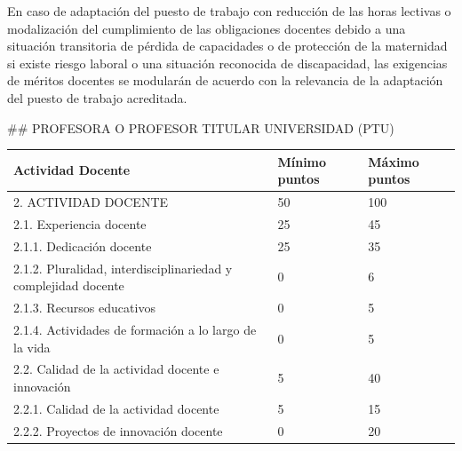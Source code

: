 \documentclass{article}
\begin{document}
\begin{itemize}
\begin{itemize}
\begin{scriptsize}
                  En caso de adaptación del puesto de trabajo con reducción de las horas lectivas o modalización del cumplimiento de las obligaciones docentes debido a una situación transitoria de pérdida de capacidades o de protección de la maternidad si existe riesgo laboral o una situación reconocida de discapacidad, las exigencias de méritos docentes se modularán de acuerdo con la relevancia de la adaptación del puesto de trabajo acreditada.

                  \#\# PROFESORA O PROFESOR TITULAR UNIVERSIDAD (PTU)

                  \vspace{0.4cm}
                  \begin{table}[h!]\centering\renewcommand{\arraystretch}{1.3}
                    \begin{tabular}{|p{}|p{}|p{}|}\hline
                      Actividad Docente                                                   & Mínimo puntos & Máximo puntos \\\hline
                      2. ACTIVIDAD DOCENTE                                                & 50            & 100           \\\hline
                      2.1. Experiencia docente                                            & 25            & 45            \\\hline
                      2.1.1. Dedicación docente                                           & 25            & 35            \\\hline
                      2.1.2. Pluralidad, interdisciplinariedad y complejidad docente      & 0             & 6             \\\hline
                      2.1.3. Recursos educativos                                          & 0             & 5             \\\hline
                      2.1.4. Actividades de formación a lo largo de la vida               & 0             & 5             \\\hline
                      2.2. Calidad de la actividad docente e innovación                   & 5             & 40            \\\hline
                      2.2.1. Calidad de la actividad docente                              & 5             & 15            \\\hline
                      2.2.2. Proyectos de innovación docente                              & 0             & 20            \\\hline

\end{tabular}
\end{table}
\end{scriptsize}
\end{itemize}
\end{itemize}
\end{document}
